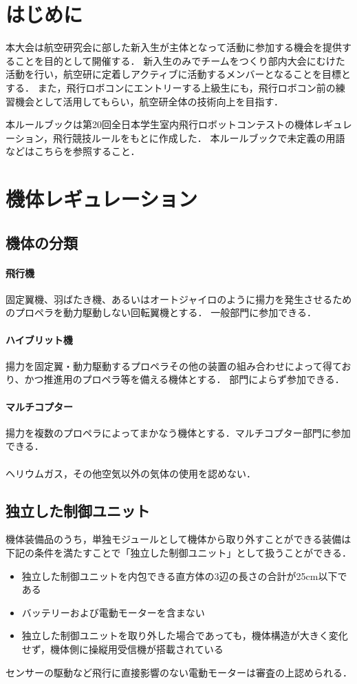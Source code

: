 \documentclass[a4paper,12pt,oneside]{jsarticle}
\begin{document}

\newpage
\tableofcontents
\newpage

\section{はじめに}
本大会は航空研究会に部した新入生が主体となって活動に参加する機会を提供することを目的として開催する．
新入生のみでチームをつくり部内大会にむけた活動を行い，航空研に定着しアクティブに活動するメンバーとなることを目標とする．
また，飛行ロボコンにエントリーする上級生にも，飛行ロボコン前の練習機会として活用してもらい，航空研全体の技術向上を目指す．

本ルールブックは第20回全日本学生室内飛行ロボットコンテストの機体レギュレーション，飛行競技ルールをもとに作成した．
本ルールブックで未定義の用語などはこちらを参照すること．

\section{機体レギュレーション}
\subsection{機体の分類}
\paragraph{飛行機}
固定翼機、羽ばたき機、あるいはオートジャイロのように揚力を発生させるためのプロペラを動力駆動しない回転翼機とする．
一般部門に参加できる．
\paragraph{ハイブリット機}
揚力を固定翼・動力駆動するプロペラその他の装置の組み合わせによって得ており、かつ推進用のプロペラ等を備える機体とする．
部門によらず参加できる．
\paragraph{マルチコプター}
揚力を複数のプロペラによってまかなう機体とする．マルチコプター部門に参加できる．

\paragraph{}ヘリウムガス，その他空気以外の気体の使用を認めない．

\subsection{独立した制御ユニット}
機体装備品のうち，単独モジュールとして機体から取り外すことができる装備は下記の条件を満たすことで「独立した制御ユニット」として扱うことができる．
\begin{itemize}
  \item 独立した制御ユニットを内包できる直方体の3辺の長さの合計が25cm以下である
  \item バッテリーおよび電動モーターを含まない
  \item 独立した制御ユニットを取り外した場合であっても，機体構造が大きく変化せず，機体側に操縦用受信機が搭載されている
\end{itemize}
センサーの駆動など飛行に直接影響のない電動モーターは審査の上認められる．
\end{document}
